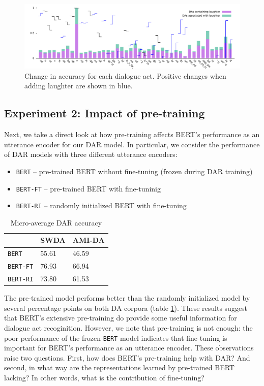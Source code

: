 \documentclass[11pt,a4paper]{article}
\begin{document}
\begin{figure}
  \centering
  \includegraphics[width=\textwidth]{img/bertLvsNL.pdf}
  \caption{Change in accuracy for each dialogue act. Positive changes when adding laughter are shown in blue. }
\end{figure}

\subsection{Experiment 2: Impact of pre-training} %
Next, we take a direct look at how pre-training affects BERT's performance as an utterance encoder for our DAR model.
In particular, we consider the performance of DAR models with three different utterance encoders:
\begin{itemize}
  \item \texttt{BERT} -- pre-trained BERT without fine-tuning (frozen during DAR training)
  \item \texttt{BERT-FT} -- pre-trained BERT with fine-tuninig 
  \item \texttt{BERT-RI} -- randomly initialized BERT with fine-tuning 
\end{itemize}

\begin{table}[]
\centering 
\begin{tabular}{@{}lll@{}}
\toprule
                 & SWDA  & AMI-DA \\ \midrule
\texttt{BERT}       & 55.61 & 46.59  \\
\texttt{BERT-FT}    & 76.93 & 66.94  \\
\texttt{BERT-RI}    & 73.80 & 61.53  
\end{tabular}
  \caption{Micro-average DAR accuracy}
  \label{table:exp2-avg}
\end{table}    

The pre-trained model performs better than the randomly initialized model by several percentage points on both DA corpora (table \ref{table:exp2-avg}). 
These results suggest that BERT's extensive pre-training do provide some useful information for dialogue act recoginition.
However, we note that pre-training is not enough: the poor performance of the frozen \texttt{BERT} model indicates that fine-tuning is important for BERT's performance as an utterance encoder.
These observations raise two questions.
First, how does BERT's pre-training help with DAR? 
And second, in what way are the representations learned by pre-trained BERT lacking?
In other words, what is the contribution of fine-tuning?
\end{document}
